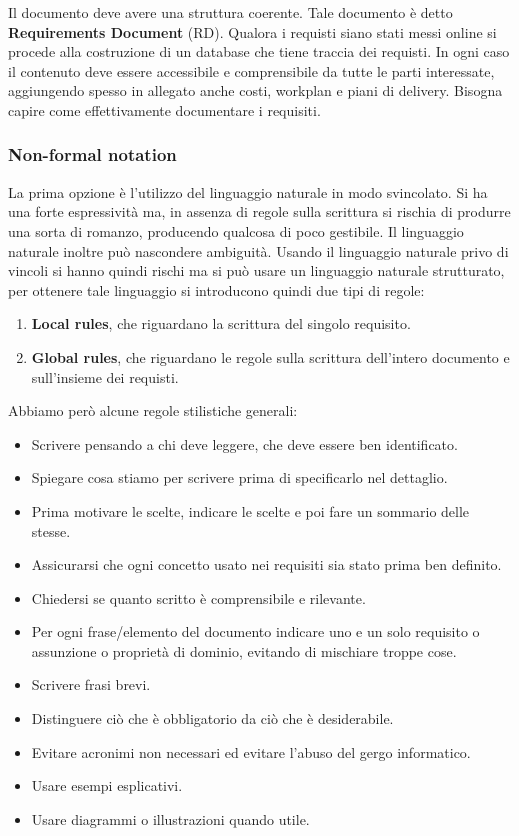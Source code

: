 Il documento deve avere una struttura coerente. Tale documento è detto
\textbf{Requirements Document} (RD). Qualora i requisti siano stati messi online
si procede alla costruzione di un database che tiene traccia dei requisti. In ogni
caso il contenuto deve essere accessibile e comprensibile da tutte le parti
interessate, aggiungendo spesso in allegato anche costi, workplan e piani di delivery.
Bisogna capire come effettivamente documentare i requisiti.

\subsubsection{Non-formal notation}
La prima opzione è l'utilizzo del linguaggio naturale in modo svincolato. Si ha
una forte espressività ma, in assenza di regole sulla scrittura si rischia di
produrre una sorta di romanzo, producendo qualcosa di poco gestibile. Il linguaggio
naturale inoltre può nascondere ambiguità. Usando il linguaggio naturale privo
di vincoli si hanno quindi rischi ma si può usare un linguaggio naturale strutturato,
per ottenere tale linguaggio si introducono quindi due tipi di regole:
\begin{enumerate}
    \item \textbf{Local rules}, che riguardano la scrittura del singolo requisito.
    \item \textbf{Global rules}, che riguardano le regole sulla scrittura
          dell'intero documento e sull'insieme dei requisti.
\end{enumerate}
Abbiamo però alcune regole stilistiche generali:
\begin{itemize}
    \item Scrivere pensando a chi deve leggere, che deve essere ben identificato.
    \item Spiegare cosa stiamo per scrivere prima di specificarlo nel dettaglio.
    \item Prima motivare le scelte, indicare le scelte e poi fare un sommario delle stesse.
    \item Assicurarsi che ogni concetto usato nei requisiti sia stato prima ben definito.
    \item Chiedersi se quanto scritto è comprensibile e rilevante.
    \item Per ogni frase/elemento del documento indicare uno e un solo requisito
          o assunzione o proprietà di dominio, evitando di mischiare troppe cose.
    \item Scrivere frasi brevi.
    \item Distinguere ciò che è obbligatorio da ciò che è desiderabile.
    \item Evitare acronimi non necessari ed evitare l'abuso del gergo informatico.
    \item Usare esempi esplicativi.
    \item Usare diagrammi o illustrazioni quando utile.
\end{itemize}

